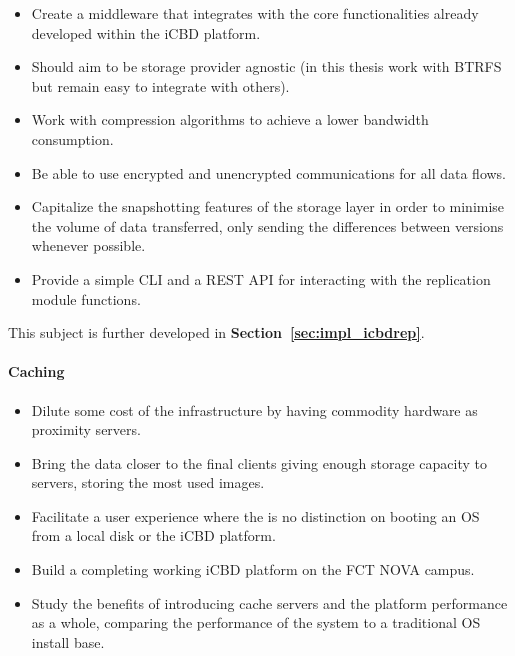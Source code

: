 \begin{itemize}
	\item Create a middleware that integrates with the core functionalities already developed within the iCBD platform.
	\item Should aim to be storage provider agnostic (in this thesis work with BTRFS but remain easy to integrate with others).
	\item Work with compression algorithms to achieve a lower bandwidth consumption.
	\item Be able to use encrypted and unencrypted communications for all data flows. 
	\item Capitalize the snapshotting features of the storage layer in order to minimise the volume of data transferred, only sending the differences between versions whenever possible.
	\item Provide a simple CLI and a REST API for interacting with the replication module functions.
\end{itemize}

This subject is further developed in \textbf{Section~\ref{sec:impl_icbdrep}}.

\paragraph{Caching}
\label{par:intro_caching_goals}

\begin{itemize}
	\item Dilute some cost of the infrastructure by having commodity hardware as proximity servers.
	\item Bring the data closer to the final clients giving enough storage capacity to servers, storing the most used images.
	\item Facilitate a user experience where the is no distinction on booting an OS from a local disk or the iCBD platform.
	\item Build a completing working iCBD platform on the FCT NOVA campus.
	\item Study the benefits of introducing cache servers and the platform performance as a whole, comparing the performance of the system to a traditional OS install base.  
\end{itemize}

